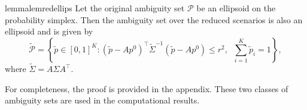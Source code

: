 \documentclass{article}
\newtheorem{lemma}[theorem]{Lemma}
\newcommand{\mP}{\mathcal{P}}
\newcommand{\mS}{\mathcal{S}}
\begin{document}
\begin{restatable}{lemma}{lemredellips}
	Let the original ambiguity set \(\mP\) be an ellipsoid on the probability simplex. Then the ambiguity set over the reduced scenarios is also an ellipsoid and is given by 
	\begin{equation*}
		\tilde{\mP}=\left\{\tilde{p}\in [0,1]^{K} : (\tilde{p} - A p^0)^{\top}\tilde{\Sigma}^{-1}(\tilde{p} - A p^0) \leq r^2,\;\; \textstyle\sum_{i=1}^{K} \tilde{p}_i=1\right\},
	\end{equation*}
	where \(\tilde{\Sigma} = A \Sigma A^{\top}\).
\end{restatable}

For completeness, the proof is provided in the appendix. These two
classes of ambiguity sets are used in the computational results. 

%
%
\end{document}
